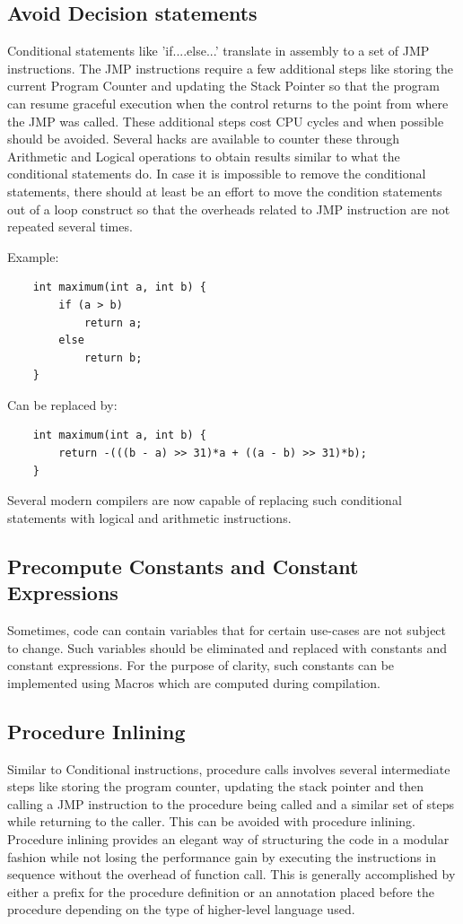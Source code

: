\documentclass[sigconf]{acmart}
\begin{document}
\subsection{Avoid Decision statements}

Conditional statements like 'if....else...' translate in assembly to a set of JMP instructions. The JMP instructions require a few additional steps like storing the current Program Counter and updating the Stack Pointer so that the program can resume graceful execution when the control returns to the point from where the JMP was called. These additional steps cost CPU cycles and when possible should be avoided. Several hacks are available to counter these through Arithmetic and Logical operations to obtain results similar to what the conditional statements do. 
In case it is impossible to remove the conditional statements, there should at least be an effort to move the condition statements out of a loop construct so that the overheads related to JMP instruction are not repeated several times. 

Example:
\begin{verbatim}
    int maximum(int a, int b) {
        if (a > b)
            return a;
        else
            return b;
    }
\end{verbatim}
Can be replaced by:
\begin{verbatim}
    int maximum(int a, int b) {
        return -(((b - a) >> 31)*a + ((a - b) >> 31)*b);
    }
\end{verbatim}

Several modern compilers are now capable of replacing such conditional statements with logical and arithmetic instructions.

\subsection{Precompute Constants and Constant Expressions}

Sometimes, code can contain variables that for certain use-cases are not subject to change. Such variables should be eliminated and replaced with constants and constant expressions. For the purpose of clarity, such constants can be implemented using Macros which are computed during compilation. 

\subsection{Procedure Inlining}
Similar to Conditional instructions, procedure calls involves several intermediate steps like storing the program counter, updating the stack pointer and then calling a JMP instruction to the procedure being called and a similar set of steps while returning to the caller. This can be avoided with procedure inlining. Procedure inlining provides an elegant way of structuring the code in a modular fashion while not losing the performance gain by executing the instructions in sequence without the overhead of function call. This is generally accomplished by either a prefix for the procedure definition or an annotation placed before the procedure depending on the type of higher-level language used. 
\end{document}
